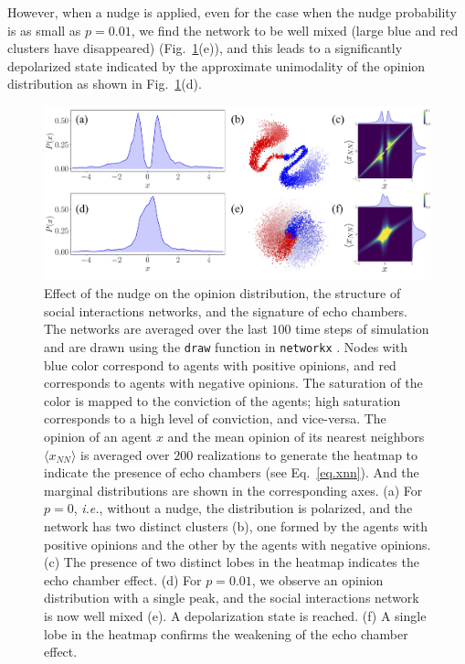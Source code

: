 However, when a nudge is applied, even for the case when the nudge probability is as small as $p = 0.01$, we find the network to be well mixed (large blue and red clusters have disappeared) (Fig.~\ref{fig:network}(e)), and this leads to a significantly depolarized state indicated by the approximate unimodality of the opinion distribution as shown in Fig.~\ref{fig:network}(d).

\begin{figure}[ht]
    \centering
    \includegraphics[width=\textwidth]{chapters/chapter2/echochamber_new.jpg}
    \caption{Effect of the nudge on the opinion distribution, the structure of social interactions networks, and the signature of echo chambers. The networks are averaged over the last $100$ time steps of simulation and are drawn using the {\tt draw} function in {\tt networkx} \cite{networkx}. Nodes with 
    blue color correspond to agents with positive opinions, and red corresponds to agents with negative opinions. The saturation of the color is mapped to the conviction of the agents; high saturation corresponds to a high level of conviction, and vice-versa. The opinion of an agent $x$ and the mean opinion of its nearest neighbors $\langle x_{NN} \rangle$ is averaged over $200$ realizations to generate the heatmap to indicate the presence of echo chambers (see Eq.~\eqref{eq.xnn}). And the marginal distributions are shown in the corresponding axes. (a) For $p= 0$, {\it i.e.}, without a nudge, the distribution is polarized, and the network has two distinct clusters (b), one formed by the agents with positive opinions and the other by the agents with negative opinions. (c) The presence of two distinct lobes in the heatmap indicates the echo chamber effect. (d) For $p = 0.01$, we observe an opinion distribution with a single peak, and the social interactions network is now well mixed (e). A depolarization state is reached. (f) A single lobe in the heatmap confirms the weakening of the echo chamber effect.}
    \label{fig:network}
\end{figure}

